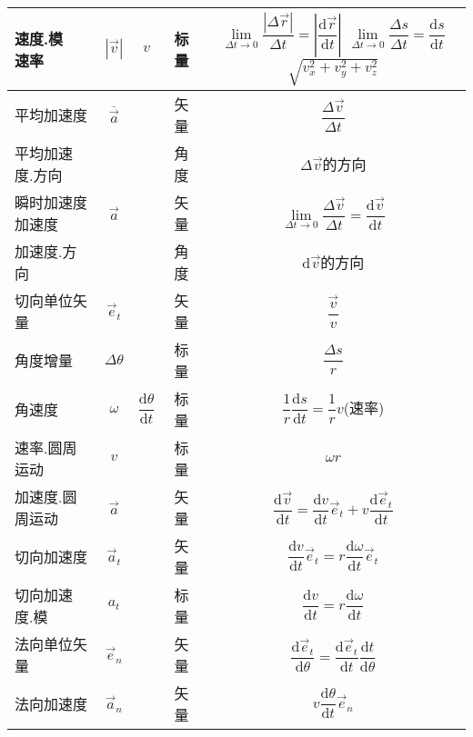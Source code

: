 \documentclass[UTF8,a4paper,12pt,scheme=chinese]{ctexbook}
\newcommand{\sll}[1]{\overrightarrow{#1}}
\newcommand{\ud}{\mathrm{d}}
\begin{document}
\begin{longtable}{|l|c|c|c|c|}
		\hline
		\makecell[l]{速度.模\\速率} & $ |\sll{v}| $ & $ v $ & 标量 & \makecell*{$ \lim\limits_{\Delta t \rightarrow 0}\dfrac{|\Delta \sll{r}|}{\Delta t}=|\dfrac{\ud \sll{r}}{\ud t}| $\\[2ex]
		$ \lim\limits_{\Delta t \rightarrow 0}\dfrac{\Delta s}{\Delta t}=\dfrac{\ud s}{\ud t} $\\[2ex]$ \sqrt{v_x^2+v_y^2+v_z^2} $}\\[2ex]
		\hline
		\rule[-2.5ex]{0pt}{7ex}平均加速度 & $ \overline{\sll{a}} $ &  & 矢量 & $ \dfrac{\Delta \sll{v}}{\Delta t} $\\
		\hline
		平均加速度.方向 &  &  & 角度 & $ \Delta \sll{v} $的方向 \\
		\hline
		\makecell[l]{瞬时加速度\\加速度} & $ \sll{a} $ &  & 矢量 & $ \lim\limits_{\Delta t \rightarrow 0}\dfrac{\Delta \sll{v}}{\Delta t}=\dfrac{\ud \sll{v}}{\ud t} $\\
		\hline
		加速度.方向 &  &  & 角度 & $ \ud \sll{v} $的方向 \\
		\hline
		\rule[-2.5ex]{0pt}{7ex}切向单位矢量 & $ \sll{e}_t $ &  & 矢量 & $ \dfrac{\sll{v}}{v} $ \\
		\hline
		
		\rule[-2.5ex]{0pt}{7ex}角度增量 & $ \Delta\theta $ &  & 标量 & $ \dfrac{\Delta s}{r} $\\
		\hline
		\rule[-2.6ex]{0pt}{7ex}角速度 & $ \omega $ & $ \dfrac{\ud\theta}{\ud t} $ & 标量 & $ \dfrac{1}{r}\dfrac{\ud s}{\ud t}=\dfrac{1}{r}v $(速率)\\
		\hline
		速率.圆周运动 & $ v $ &  & 标量 & $ \omega r $\\
		\hline
		
		\rule[-2.6ex]{0pt}{7ex}加速度.圆周运动 & $ \sll{a} $ &  & 矢量 & $ \dfrac{\ud \sll{v}}{\ud t}=\boxed{\dfrac{\ud v}{\ud t}\sll{e}_t}+\boxed{v\dfrac{\ud \sll{e}_t}{\ud t}} $\\
		\hline
		\rule[-2.5ex]{0pt}{7ex}切向加速度 & $ \sll{a}_t $ &  & 矢量 & $ \dfrac{\ud v}{\ud t}\sll{e}_t=r\dfrac{\ud \omega}{\ud t}\sll{e}_t $ \\
		\hline
		\rule[-2.5ex]{0pt}{7ex}切向加速度.模 & $ {a}_t $ &  & 标量 & $ \dfrac{\ud v}{\ud t}=r\dfrac{\ud \omega}{\ud t} $ \\
		\hline
		\rule[-2.5ex]{0pt}{7ex}法向单位矢量 & $ \sll{e}_n $ &  & 矢量 & $ \dfrac{\ud\sll{e}_t}{\ud\theta}=\dfrac{\ud\sll{e}_t}{\ud t}\dfrac{\ud t}{\ud\theta} $\\
		\hline
		\rule[-2.5ex]{0pt}{7ex}法向加速度 & $ \sll{a}_n $ &  & 矢量 & $ v\dfrac{\ud \theta}{\ud t}\sll{e}_n $\\
		\hline
		
		
		
	\end{longtable} 
\end{document}
